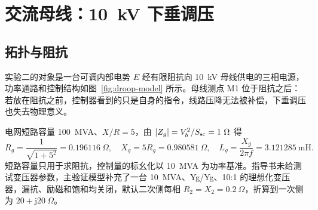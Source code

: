 
\chapter{交流母线：10~kV 下垂调压}
\label{chap:bus}

\section{拓扑与阻抗}

实验二的对象是一台可调内部电势 $E$ 经有限阻抗向 10~kV 母线供电的三相电源，功率通路和控制结构如图~\ref{fig:droop-model} 所示。母线测点 M1 位于阻抗之后：若放在阻抗之前，控制器看到的只是自身的指令，线路压降无法被补偿，下垂调压也失去物理意义。

电网短路容量 100~MVA、$X/R=5$，由 $|Z_g|=V_b^2/S_{\mathrm{sc}}=1\ \Omega$ 得
\begin{equation}
R_g=\frac{1}{\sqrt{1+5^2}}=0.196116\ \Omega,\quad
X_g=5R_g=0.980581\ \Omega,\quad
L_g=\frac{X_g}{2\pi f}=3.121285\ \mathrm{mH}.
\label{eq:zg}
\end{equation}
短路容量只用于求阻抗，控制量的标幺化以 10~MVA 为功率基准。指导书未给测试变压器参数，主验证模型补充了一台 10~MVA、Yg/Yg、10:1 的理想化变压器，漏抗、励磁和饱和均关闭，默认二次侧每相 $R_2=X_2=0.2\ \Omega$，折算到一次侧为 $20+\mathrm{j}20\ \Omega$。

